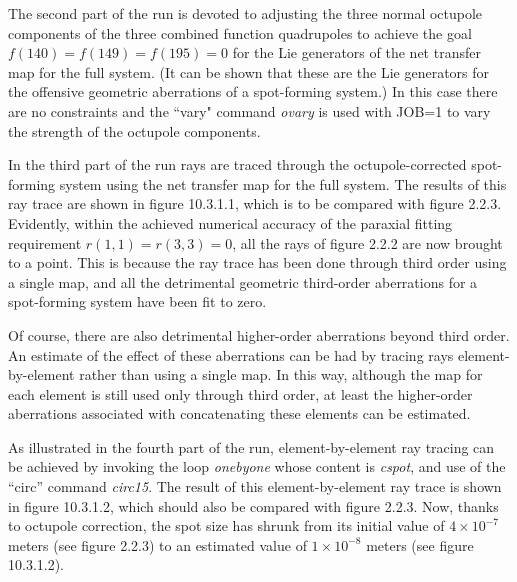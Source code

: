 The second part of the run is devoted to adjusting the three normal
octupole components of the three combined function quadrupoles to achieve
the goal $f(140) = f(149) = f(195) = 0$ for the Lie generators of the net
transfer map for the full system.  (It can be shown that these are the
Lie generators for the offensive geometric aberrations of a spot-forming
system.)  In this case there are no constraints and the ``vary" command
{\em ovary} is used with JOB=1 to vary the strength of the octupole
components.

In the third part of the run rays are traced through the
octupole-corrected spot-forming system using the net transfer map for the
full system.  The results of this ray trace are shown in figure 10.3.1.1,
which is to be compared with figure 2.2.3.  Evidently, within the achieved
numerical accuracy of the paraxial fitting requirement $r(1,1) = r(3,3) =
0$, all the rays of figure 2.2.2 are now brought to a point.  This is
because the ray trace has been done through third order using a single
map, and all the detrimental geometric third-order aberrations for a
spot-forming system have been fit to zero.

Of course, there are also detrimental higher-order aberrations beyond
third order.  An estimate of the effect of these aberrations can be had
by tracing rays element-by-element rather than using a single map.  In
this way, although the map for each element is still used only through
third order, at least the higher-order aberrations associated with
concatenating these elements can be estimated. 

As illustrated in the fourth part of the run, element-by-element ray
tracing can be achieved by invoking the loop {\em onebyone} whose
content is {\em cspot}, and use of the ``circ'' command {\em circ15}.
The result of this element-by-element ray trace is shown in figure 10.3.1.2,
which should also be compared with figure 2.2.3.  Now, thanks to octupole
correction, the spot size has shrunk from its initial value of $4 \times
10^{-7}$ meters (see figure 2.2.3) to an estimated value of $1 \times
10^{-8}$ meters (see figure 10.3.1.2).

